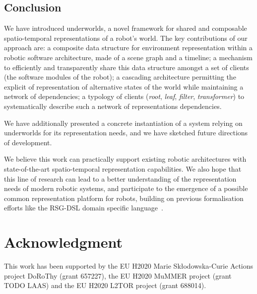 \documentclass[letterpaper, 10pt, conference]{ieeeconf}
\newcommand{\uwds}{{\sc underworlds}\xspace}
\begin{document}
\subsection{Conclusion}

We have introduced \uwds, a novel framework for shared and composable
spatio-temporal representations of a robot's world. The key contributions of our
approach are: a composite data structure for environment representation within a
robotic software architecture, made of a scene graph and a timeline; a mechanism
to efficiently and transparently share this data structure amongst a set of
clients (the software modules of the robot); a cascading architecture permitting
the explicit of representation of alternative states of the world while
maintaining a network of dependencies; a typology of clients
(\emph{root}, \emph{leaf}, \emph{filter}, \emph{transformer}) to systematically
describe such a network of representations dependencies.

We have additionally presented a concrete instantiation of a system relying on \uwds
for its representation needs, and we have sketched future directions of
development.

We believe this work can practically support existing robotic architectures with
state-of-the-art spatio-temporal representation capabilities. We also hope that
this line of research can lead to a better understanding of the representation
needs of modern robotic systems, and participate to the emergence of a possible
common representation platform for robots, building on previous formalisation
efforts like the RSG-DSL domain specific language~\cite{blumenthal2014towards}.

\section*{Acknowledgment}

This work has been supported by the EU H2020 Marie Sk\l odowska-Curie Actions
project DoRoThy (grant 657227),  the EU H2020 MuMMER project (grant TODO LAAS)
and the EU H2020 L2TOR project (grant 688014).




\end{document}
